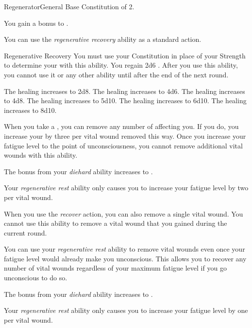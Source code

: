     \begin{feat}{Regenerator}{General}
        \featpre Base Constitution of 2.

         You gain a  bonus to .

         You can use the \textit{regenerative recovery} ability as a standard action.
        \begin{instantability}{Regenerative Recovery}
            \rankline
            You must use your Constitution in place of your Strength to determine your  with this ability.
            You regain 2d6 \add {} .
            After you use this ability, you cannot use it or any other  ability until after the end of the next round.

            \rankline
             The healing increases to 2d8.
             The healing increases to 4d6.
             The healing increases to 4d8.
             The healing increases to 5d10.
             The healing increases to 6d10.
             The healing increases to 8d10.
        \end{instantability}

         When you take a , you can remove any number of  affecting you.
        If you do, you increase your  by three per vital wound removed this way.
        Once you increase your fatigue level to the point of unconsciousness, you cannot remove additional vital wounds with this ability.

         The bonus from your \textit{diehard} ability increases to .

         Your \textit{regenerative rest} ability only causes you to increase your fatigue level by two per vital wound.

         When you use the \textit{recover} action, you can also remove a single vital wound.
        You cannot use this ability to remove a vital wound that you gained during the current round.

         You can use your \textit{regenerative rest} ability to remove vital wounds even once your fatigue level would already make you unconscious.
        This allows you to recover any number of vital wounds regardless of your maximum fatigue level if you go unconscious to do so.

         The bonus from your \textit{diehard} ability increases to .

         Your \textit{regenerative rest} ability only causes you to increase your fatigue level by one per vital wound.
    \end{feat}


